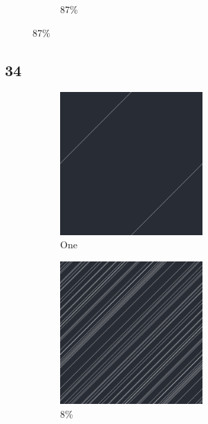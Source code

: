 \documentclass[12pt, fleqn]{report}                             %
\theoremstyle{break}                                            %
\begin{document}
\begin{figure}[ht!]
\begin{subfigure}[b]{0.4\linewidth}
          \caption{87\%}
        \end{subfigure}
      \end{figure}


      \clearpage
      \subsection{34}
      \begin{figure}[ht!]
        \centering
        \begin{subfigure}[b]{0.4\linewidth}
          \includegraphics[width=0.6\textwidth]{Images/34/a.png}
          \caption{One}
        \end{subfigure}
        \begin{subfigure}[b]{0.4\linewidth}
          \includegraphics[width=0.6\textwidth]{Images/34/b.png}
          \caption{8\%}
        \end{subfigure}
        \begin{subfigure}[b]{0.4\linewidth}

\end{subfigure}
\end{figure}
\end{document}
